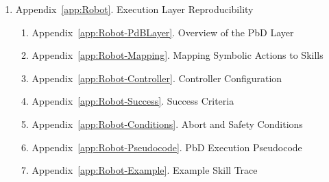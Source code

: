 \begin{enumerate}
  \begin{enumerate}
    \item Appendix~\ref{app:instances}. Instances
    \item Appendix~\ref{app:property_probing}. Property Probing Execution
    \item Appendix~\ref{app:task_planning_demo}. Task Planning Demo
  \end{enumerate}
  \item Appendix~\ref{app:Robot}. Execution Layer Reproducibility
  \begin{enumerate}
    \item Appendix~\ref{app:Robot-PdBLayer}. Overview of the PbD Layer
    \item Appendix~\ref{app:Robot-Mapping}. Mapping Symbolic Actions to Skills
    \item Appendix~\ref{app:Robot-Controller}. Controller Configuration
    \item Appendix~\ref{app:Robot-Success}. Success Criteria
    \item Appendix~\ref{app:Robot-Conditions}. Abort and Safety Conditions
    \item Appendix~\ref{app:Robot-Pseudocode}. PbD Execution Pseudocode
    \item Appendix~\ref{app:Robot-Example}. Example Skill Trace
  \end{enumerate}
\end{enumerate}